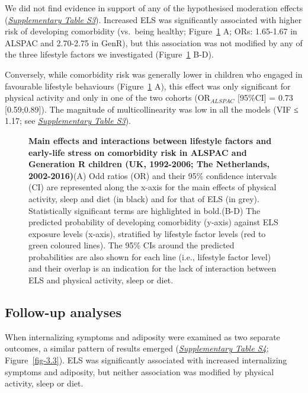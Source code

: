 \documentclass[
  letterpaper,
  DIV=11,
  numbers=noendperiod]{scrreport}
\begin{document}
We did not find evidence in support of any of the hypothesised
moderation effects (\href{https://osf.io/x9g6b}{\emph{Supplementary
Table S3}}). Increased ELS was significantly associated with higher risk
of developing comorbidity (vs.~being healthy; Figure~\ref{fig-3.2} A;
ORs: 1.65-1.67 in ALSPAC and 2.70-2.75 in GenR), but this association
was not modified by any of the three lifestyle factors we investigated
(Figure~\ref{fig-3.2} B-D).

Conversely, while comorbidity risk was generally lower in children who
engaged in favourable lifestyle behaviours (Figure~\ref{fig-3.2} A),
this effect was only significant for physical activity and only in one
of the two cohorts (OR\emph{\(_{ALSPAC}\)} {[}95\%CI{]} = 0.73
{[}0.59;0.89{]}). The magnitude of multicollinearity was low in all the
models (VIF ≤ 1.17; see \href{https://osf.io/x9g6b}{\emph{Supplementary
Table S3}}).

\begin{figure}[H]


\caption{\label{fig-3.2}\textbf{Main effects and interactions between
lifestyle factors and early-life stress on comorbidity risk in ALSPAC
and Generation R children (UK, 1992-2006; The Netherlands,
2002-2016)}\newline(A) Odd ratios (OR) and their 95\% confidence
intervals (CI) are represented along the x-axis for the main effects of
physical activity, sleep and diet (in black) and for that of ELS (in
grey). Statistically significant terms are highlighted in
bold.\newline(B-D) The predicted probability of developing comorbidity
(y-axis) against ELS exposure levels (x-axis), stratified by lifestyle
factor levels (red to green coloured lines). The 95\% CIs around the
predicted probabilities are also shown for each line (i.e., lifestyle
factor level) and their overlap is an indication for the lack of
interaction between ELS and physical activity, sleep or diet.}

\end{figure}%

\subsection{Follow-up analyses}\label{follow-up-analyses-2}

When internalizing symptoms and adiposity were examined as two separate
outcomes, a similar pattern of results emerged
(\href{https://osf.io/x9g6b}{\emph{Supplementary Table S4}};
Figure~\ref{fig-3.3}). ELS was significantly associated with increased
internalizing symptoms and adiposity, but neither association was
modified by physical activity, sleep or diet.
\end{document}
